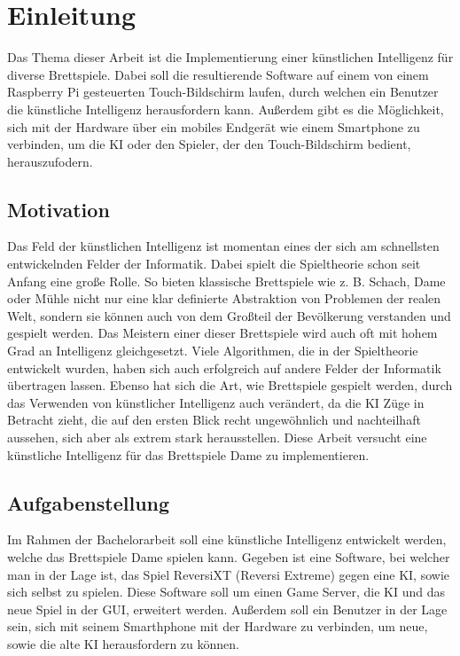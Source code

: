 \documentclass[12pt,a4paper,bibliography=totocnumbered,listof=totocnumbered]{article}
\begin{document}
\section{Einleitung}
Das Thema dieser Arbeit ist die Implementierung einer künstlichen Intelligenz für diverse
Brettspiele. Dabei soll die resultierende Software auf einem von einem Raspberry Pi gesteuerten 
Touch-Bildschirm laufen, durch welchen ein Benutzer die künstliche Intelligenz herausfordern kann.
Außerdem gibt es die Möglichkeit, sich mit der Hardware über ein mobiles Endgerät wie einem 
Smartphone zu verbinden, um die KI oder den Spieler, der den Touch-Bildschirm bedient,
herauszufodern.

\subsection{Motivation}
Das Feld der künstlichen Intelligenz ist momentan eines der sich am schnellsten 
entwickelnden Felder der Informatik. Dabei spielt die Spieltheorie schon seit Anfang eine 
große Rolle. So bieten klassische Brettspiele wie z. B. Schach, Dame oder Mühle nicht nur 
eine klar definierte Abstraktion von Problemen der realen Welt, sondern sie können auch von
dem Großteil der Bevölkerung verstanden und gespielt werden. Das Meistern einer dieser 
Brettspiele wird auch oft mit hohem Grad an Intelligenz gleichgesetzt. Viele Algorithmen,
die in der Spieltheorie entwickelt wurden, haben sich auch erfolgreich auf andere Felder
der Informatik übertragen lassen. Ebenso hat sich die Art, wie Brettspiele gespielt werden, 
durch das Verwenden von künstlicher Intelligenz auch verändert, da die KI Züge in Betracht 
zieht, die auf den ersten Blick recht ungewöhnlich und nachteilhaft aussehen, sich aber als 
extrem stark herausstellen. Diese Arbeit versucht eine künstliche Intelligenz für das
Brettspiele Dame zu implementieren.

\subsection{Aufgabenstellung}
\label{chap:Aufgabenstellung}
Im Rahmen der Bachelorarbeit soll eine künstliche Intelligenz entwickelt werden, welche 
das Brettspiele Dame spielen kann. Gegeben ist eine Software, bei welcher man in der Lage ist,
das Spiel ReversiXT (Reversi Extreme) gegen eine KI, sowie sich selbst zu spielen. Diese 
Software soll um einen Game Server, die KI und das neue Spiel in der GUI, erweitert werden.
Außerdem soll ein Benutzer in der Lage sein, sich mit seinem Smarthphone mit der Hardware zu 
verbinden, um neue, sowie die alte KI herausfordern zu können.
\end{document}
